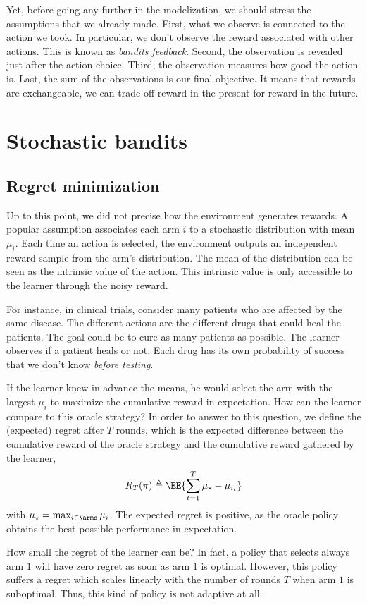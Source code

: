 {Yet, before going any further in the modelization, we should stress the assumptions that we already made. First, what we observe is connected to the action we took. In particular, we don't observe the reward associated with other actions. This is known as \emph{bandits feedback}. Second, the observation is revealed just after the action choice. Third, the observation measures how good the action is. Last, the sum of the observations is our final objective. It means that rewards are exchangeable, we can trade-off reward in the present for reward in the future.

\section{Stochastic bandits}
\label{sec:stoch-bandits}
\subsection{Regret minimization}
Up to this point, we did not precise how the environment generates rewards. A popular assumption associates each arm $i$ to a stochastic distribution with mean $\mu_i$. Each time an action is selected, the environment outputs an independent reward sample from the arm's distribution. The mean of the distribution can be seen as the intrinsic value of the action. This intrinsic value is only accessible to the learner through the noisy reward.

For instance, in clinical trials, consider many patients who are affected by the same disease. The different actions are the different drugs that could heal the patients. The goal could be to cure as many patients as possible. The learner observes if a patient heals or not.  Each drug has its own probability of success that we don't know \emph{before testing}. 

If the learner knew in advance the means, he would select the arm with the largest $\mu_i$ to maximize the cumulative reward in expectation. How can the learner compare to this oracle strategy? In order to answer to this question, we define the (expected) regret after $T$ rounds, which is the expected difference between the cumulative reward of the oracle strategy and the cumulative reward gathered by the learner,
\[
R_T(\pi) \triangleq \EE{\sum_{t=1}^T \mu_\star - \mu_{i_t}}
\]
with $\mu_\star = \max_{i\in \arms} \mu_i$. The expected regret is positive, as the oracle policy obtains the best possible performance in expectation. 

How small the regret of the learner can be? In fact, a policy that selects always arm $1$ will have zero regret as soon as arm $1$ is optimal. However, this policy suffers a regret which scales linearly with the number of rounds $T$ when arm $1$ is suboptimal. Thus, this kind of policy is not adaptive at all.  

}
